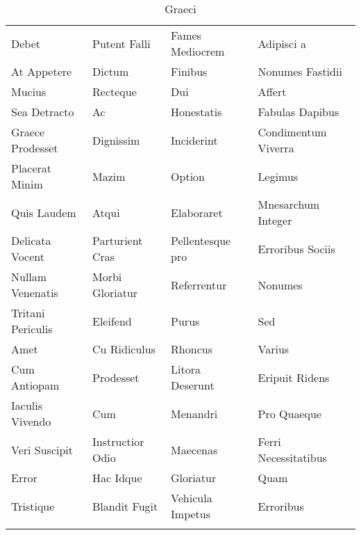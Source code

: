 \documentclass[a4paper]{article}
\begin{document}
\begin{longtable}{p{30mm}p{30mm}p{30mm}p{30mm}}
        Debet & Putent Falli & Fames Mediocrem & Adipisci a\\

        At Appetere & Dictum & Finibus & Nonumes Fastidii\\

        Mucius & Recteque & Dui & Affert\\

        Sea Detracto & Ac & Honestatis & Fabulas Dapibus\\

        Graece Prodesset & Dignissim & Inciderint & Condimentum Viverra\\

        Placerat Minim & Mazim & Option & Legimus\\

        Quis Laudem & Atqui & Elaboraret & Mnesarchum Integer\\

        Delicata Vocent & Parturient Cras & Pellentesque pro & Erroribus Sociis\\

        Nullam Venenatis & Morbi Gloriatur & Referrentur & Nonumes\\

        Tritani Periculis & Eleifend & Purus & Sed\\

        Amet & Cu Ridiculus & Rhoncus & Varius\\

        Cum Antiopam & Prodesset & Litora Deserunt & Eripuit Ridens\\

        Iaculis Vivendo & Cum & Menandri & Pro Quaeque\\

        Veri Suscipit & Instructior Odio & Maecenas & Ferri Necessitatibus\\

        Error & Hac Idque & Gloriatur & Quam\\

        Tristique & Blandit Fugit & Vehicula Impetus & Erroribus\\

        \bottomrule

        \caption{Graeci}

    \end{longtable}
\end{document}
